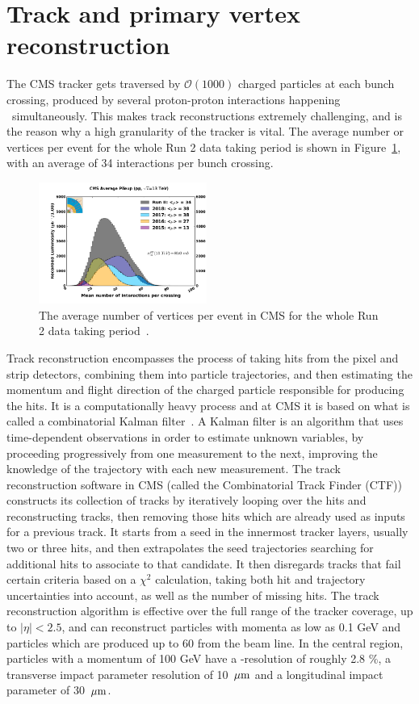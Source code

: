 \section{Track and primary vertex reconstruction}
The CMS tracker gets traversed by $\mathcal{O}(1000)$ charged particles at each bunch crossing, produced by several proton-proton interactions happening ~simultaneously. This makes track reconstructions extremely challenging, and is the reason why a high granularity of the tracker is vital.
The average number or vertices per event for the whole Run 2 data taking period is shown in Figure~\ref{fig:objreco:pu}, with an average of 34 interactions per bunch crossing.
\begin{figure}[h!] 
    \centering
    \includegraphics[width=0.49\textwidth]{figures/event_reconstruction/pu.pdf}
    \caption{The average number of vertices per event in CMS for the whole Run 2 data taking period~\cite{CMSlumi}.}
    \label{fig:objreco:pu}
\end{figure}
Track reconstruction encompasses the process of taking hits from the pixel and strip detectors, combining them into particle trajectories, and then estimating the momentum and flight direction of the charged particle responsible for producing the hits. It is a computationally heavy process and at CMS it is based on what is called a combinatorial Kalman filter~\cite{BILLOIR1989390}. A Kalman filter is an algorithm that uses time-dependent observations in order to estimate unknown variables, by proceeding progressively from one measurement to the next, improving the knowledge of the
trajectory with each new measurement. The track reconstruction software in CMS (called the Combinatorial Track Finder (CTF)) constructs its collection of tracks by iteratively looping over the hits and reconstructing tracks, then removing those hits which are already used as inputs for a previous track. It starts from a seed in the innermost tracker layers, usually two or three hits, and then extrapolates the seed trajectories searching for additional hits to associate to that candidate. It then disregards tracks that fail certain criteria  based on a $\chi^2$ calculation, taking both hit and trajectory uncertainties into account, as well as the number of missing hits.
The track reconstruction algorithm is effective over the full range of the tracker coverage, up to $|\eta|<2.5$, and can reconstruct particles with momenta as low as 0.1 GeV and particles which are produced up to 60 \cm from the beam line. In the central region, particles with a momentum of 100 GeV have a \PT-resolution of roughly 2.8 \%, a transverse impact parameter resolution of 10 $\,\mu\text{m}$ and a longitudinal impact parameter of 30 $\,\mu\text{m}$. 

